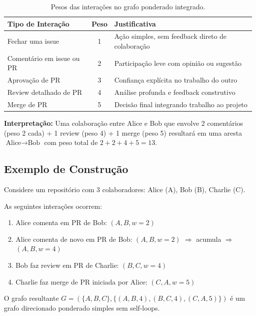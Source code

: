\documentclass[12pt,a4paper]{article}
\begin{document}
\begin{table}[h]
  \centering
  \caption{Pesos das interações no grafo ponderado integrado.}
  \label{tab:pesos}
  \begin{tabular}{l|c|p{6cm}}
    \toprule
    \textbf{Tipo de Interação} & \textbf{Peso} & \textbf{Justificativa} \\
    \midrule
    Fechar uma issue & 1 & Ação simples, sem feedback direto de colaboração \\
    Comentário em issue ou PR & 2 & Participação leve com opinião ou sugestão \\
    Aprovação de PR & 3 & Confiança explícita no trabalho do outro \\
    Review detalhado de PR & 4 & Análise profunda e feedback construtivo \\
    Merge de PR & 5 & Decisão final integrando trabalho ao projeto \\
    \bottomrule
  \end{tabular}
\end{table}

\textbf{Interpretação:} Uma colaboração entre Alice e Bob que envolve 2 comentários (peso 2 cada) + 1 review (peso 4) + 1 merge (peso 5) resultará em uma aresta $\text{Alice} \to \text{Bob}$ com peso total de $2 + 2 + 4 + 5 = 13$.

\subsection{Exemplo de Construção}

Considere um repositório com 3 colaboradores: Alice (A), Bob (B), Charlie (C).

As seguintes interações ocorrem:
\begin{enumerate}
  \item Alice comenta em PR de Bob: $(A, B, w=2)$
  \item Alice comenta de novo em PR de Bob: $(A, B, w=2)$ $\Rightarrow$ acumula $\Rightarrow$ $(A, B, w=4)$
  \item Bob faz review em PR de Charlie: $(B, C, w=4)$
  \item Charlie faz merge de PR iniciada por Alice: $(C, A, w=5)$
\end{enumerate}

O grafo resultante $G = (\{A, B, C\}, \{(A,B,4), (B,C,4), (C,A,5)\})$ é um grafo direcionado ponderado simples sem self-loops.
\end{document}
